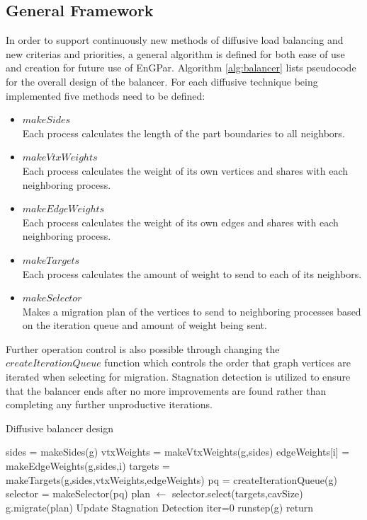 \documentclass[a4paper]{article}
\begin{document}
\subsection{General Framework}
In order to support continuously new methods of diffusive load balancing and new criterias and priorities, a general algorithm is defined for both ease of use and creation for future use of EnGPar. Algorithm \ref{alg:balancer} lists pseudocode for the overall design of the balancer. For each diffusive technique being implemented five methods need to be defined:
\begin{itemize}
  \item $makeSides$\\
    Each process calculates the length of the part boundaries to all neighbors.
  \item $makeVtxWeights$ \\
    Each process calculates the weight of its own vertices and shares with each neighboring process.
  \item $makeEdgeWeights$ \\
    Each process calculates the weight of its own edges and shares with each neighboring process.
  \item $makeTargets$\\
    Each process calculates the amount of weight to send to each of its neighbors.
  \item $makeSelector$\\
    Makes a migration plan of the vertices to send to neighboring processes based on the iteration queue and amount of weight being sent.
\end{itemize}
Further operation control is also possible through changing the $createIterationQueue$ function which controls the order that graph vertices are iterated when selecting for migration. Stagnation detection is utilized to ensure that the balancer ends after no more improvements are found rather than completing any further unproductive iterations.

\begin{algorithm}
\caption{Diffusive balancer design}\label{alg:balancer}
\begin{algorithmic}
  \State sides = makeSides(g)
  \State vtxWeights = makeVtxWeights(g,sides)
  \State edgeWeights[i] = makeEdgeWeights(g,sides,i)
  \EndFor
  \State targets = makeTargets(g,sides,vtxWeights,edgeWeights)
  \State pq = createIterationQueue(g)
  \State selector = makeSelector(pq)
  \State plan $\leftarrow$ selector.select(targets,cavSize)
  \EndFor
  \State g.migrate(plan)
  \State Update Stagnation Detection
  \EndProcedure
  \State iter=0
  \State runstep(g)
  \State return
  \EndIf
  \EndFor
  \EndProcedure
\end{algorithmic}
\end{algorithm}
\end{document}
